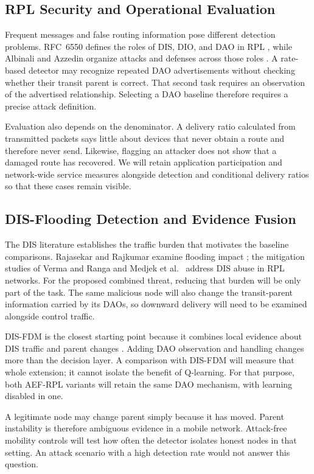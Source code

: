 \documentclass[journal]{IEEEtran}
\begin{document}
\subsection{RPL Security and Operational Evaluation}
Frequent messages and false routing information pose different detection problems. RFC~6550 defines the roles of DIS, DIO, and DAO in RPL \cite{rfc6550}, while Albinali and Azzedin organize attacks and defenses across those roles \cite{albinali2024}. A rate-based detector may recognize repeated DAO advertisements without checking whether their transit parent is correct. That second task requires an observation of the advertised relationship. Selecting a DAO baseline therefore requires a precise attack definition.

Evaluation also depends on the denominator. A delivery ratio calculated from transmitted packets says little about devices that never obtain a route and therefore never send. Likewise, flagging an attacker does not show that a damaged route has recovered. We will retain application participation and network-wide service measures alongside detection and conditional delivery ratios so that these cases remain visible.

\subsection{DIS-Flooding Detection and Evidence Fusion}
The DIS literature establishes the traffic burden that motivates the baseline comparisons. Rajasekar and Rajkumar examine flooding impact \cite{rajasekar2022}; the mitigation studies of Verma and Ranga \cite{vermaranga2020} and Medjek et al.\ \cite{medjek2021} address DIS abuse in RPL networks. For the proposed combined threat, reducing that burden will be only part of the task. The same malicious node will also change the transit-parent information carried by its DAOs, so downward delivery will need to be examined alongside control traffic.

DIS-FDM is the closest starting point because it combines local evidence about DIS traffic and parent changes \cite{prajisha2025}. Adding DAO observation and handling changes more than the decision layer. A comparison with DIS-FDM will measure that whole extension; it cannot isolate the benefit of Q-learning. For that purpose, both AEF-RPL variants will retain the same DAO mechanism, with learning disabled in one.

A legitimate node may change parent simply because it has moved. Parent instability is therefore ambiguous evidence in a mobile network. Attack-free mobility controls will test how often the detector isolates honest nodes in that setting. An attack scenario with a high detection rate would not answer this question.
\end{document}
